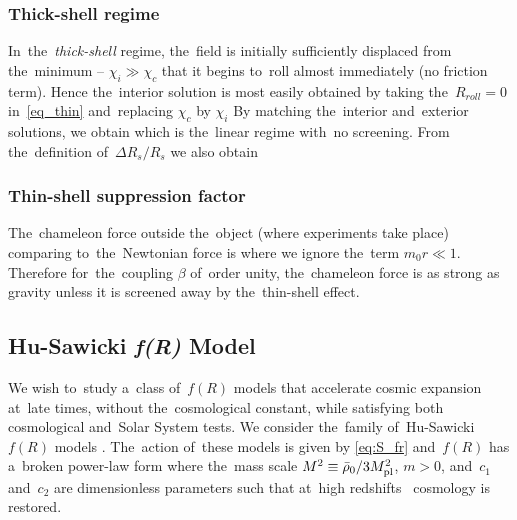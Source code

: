 \subsubsection{Thick-shell regime}
In~the~\textit{thick-shell} regime, the~field is initially sufficiently displaced from the~minimum -- $\chi_i\gg\chi_c$ that it begins to~roll almost immediately (no friction term). Hence the~interior solution is most easily obtained by taking the~$R_{roll}=0$ in~\eqref{eq_thin} and~replacing $\chi_c$ by $\chi_i$
By matching the~interior and~exterior solutions, we obtain
which is the~linear regime with~no screening. From the~definition of~$\Delta R_s/R_s$ we also obtain
\subsubsection{Thin-shell suppression factor}
The~chameleon force outside the~object (where experiments take place) comparing to~the~Newtonian force is
where we ignore the~term $m_0 r\ll1$. Therefore for~the~coupling $\beta$ of~order unity, the~chameleon force is as strong as gravity unless it is screened away by the~thin-shell effect.
\subsection{Hu-Sawicki \texorpdfstring{\textit{\lowercase{f}(R)}}{fR} Model}
We wish to~study a~class of~$f(R)$ models that accelerate cosmic expansion at~late times, without the~cosmological constant, while satisfying both cosmological and~Solar System tests. We consider the~family of~Hu-Sawicki $f(R)$ models \parencite{Hu-Saw}. The~action of~these models is given by \eqref{eq:S_fr} and~$f(R)$ has a~broken power-law form
where the~mass scale $M^2\equiv\bar\rho_0/3M_{\text{\scriptsize pl}}^2$, $m>0$, and~$c_1$ and~$c_2$ are dimensionless parameters such that at~high redshifts \LCDM\ cosmology is restored.

